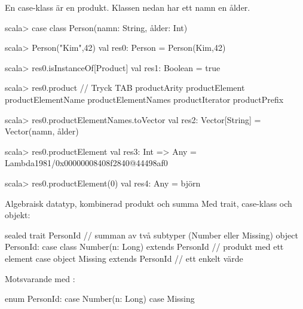 \begin{Slide}{En case-klass är en produkt.}
Klassen  nedan har ett namn  en ålder.
\begin{REPL}
scala> case class Person(namn: String, ålder: Int)

scala> Person("Kim",42)
val res0: Person = Person(Kim,42)

scala> res0.isInstanceOf[Product]
val res1: Boolean = true

scala> res0.product   // Tryck TAB
productArity          productElement    productElementName
productElementNames   productIterator   productPrefix
          
scala> res0.productElementNames.toVector
val res2: Vector[String] = Vector(namn, ålder)

scala> res0.productElement
val res3: Int => Any = Lambda1981/0x00000008408f2840@44498af0

scala> res0.productElement(0)
val res4: Any = björn

\end{REPL} 
\end{Slide}


\begin{Slide}{Algebraisk datatyp, kombinerad produkt och summa}\SlideFontSmall
Med trait, case-klass och objekt:
\begin{Code}
sealed trait PersonId // summan av två subtyper (Number eller Missing)
object PersonId:  
  case class Number(n: Long) extends PersonId  // produkt med ett element
  case object Missing extends PersonId         // ett enkelt värde
\end{Code}
\pause Motsvarande med :
\begin{Code}
enum PersonId:
  case Number(n: Long)
  case Missing     
\end{Code}

\end{Slide}

